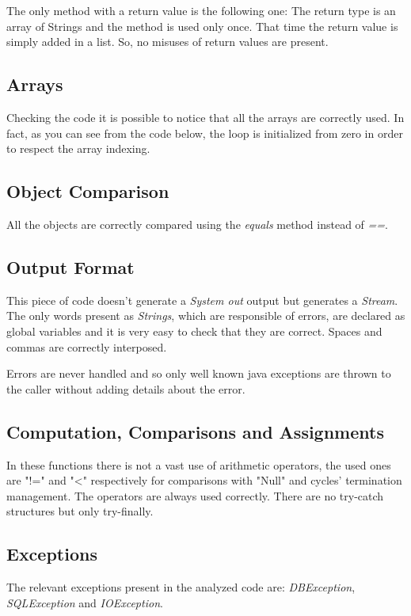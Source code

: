 \documentclass[a4paper]{article}
\begin{document}
The only method with a return value is the following one:
The return type is an array of Strings and the method is used only once. That time the return value is simply added in a list. So, no misuses of return values are present.

\subsection{Arrays}

Checking the code it is possible to notice that all the arrays are correctly used. In fact, as you can see from the code below, the loop is initialized from zero in order to respect the array indexing.

\subsection{Object Comparison}
All the objects are correctly compared using the \emph{equals} method instead of \emph{==}.

\subsection{Output Format}

This piece of code doesn't generate a \emph{System out} output but generates a \emph{Stream}. The only words present as \emph{Strings}, which are responsible of errors, are declared as global variables and it is very easy to check that they are correct. Spaces and commas are correctly interposed.

Errors are never handled and so only well known java exceptions are thrown to the caller without adding details about the error.

\subsection{Computation, Comparisons and Assignments}
In these functions there is not a vast use of arithmetic operators, the used ones are "!=" and "<" respectively for comparisons with "Null" and cycles' termination management. The operators are always used correctly. There are no try-catch structures but only try-finally.

\subsection{Exceptions}

The relevant exceptions present in the analyzed code are: 
\emph{DBException}, \emph{SQLException} and \emph{IOException}.
\end{document}
